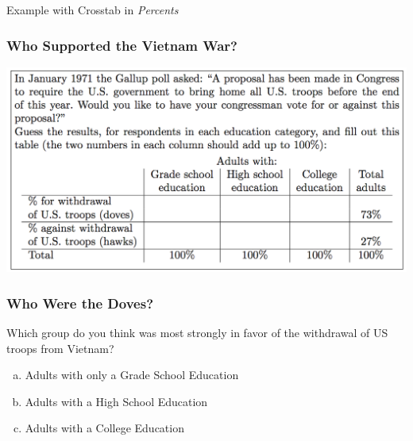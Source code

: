 \documentclass[handout]{beamer}
\begin{document}
\begin{frame}

\vspace{3em}
\huge \centering Example with Crosstab in \emph{Percents}



\end{frame}




\begin{frame}
\frametitle{Who Supported the Vietnam War?}
\begin{center}
\includegraphics[scale = 0.27]{./images/vietnam_question}
\end{center}



\end{frame}

\begin{frame}
\frametitle{Who Were the Doves?}
Which group do you think was most strongly \alert{in favor of} the withdrawal of US troops from Vietnam?
\begin{enumerate}[(a)]
	\item Adults with only a Grade School Education
	\item Adults with a High School Education
	\item Adults with a College Education
\end{enumerate}

\end{frame}
\end{document}
